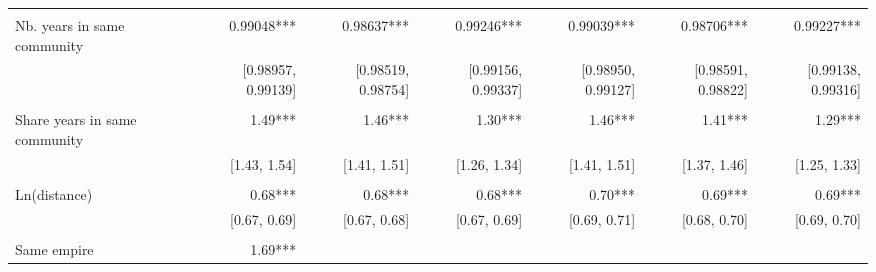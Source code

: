 \begin{table}[!h]
\begin{tabular}{lllllll}
  \multicolumn{1}{r}{} &
  \multicolumn{1}{r}{} &
  \multicolumn{1}{r}{} \\
\multicolumn{1}{l}{Nb. years in same community} &
  \multicolumn{1}{|r}{0.99048***} &
  \multicolumn{1}{r}{0.98637***} &
  \multicolumn{1}{r}{0.99246***} &
  \multicolumn{1}{r}{0.99039***} &
  \multicolumn{1}{r}{0.98706***} &
  \multicolumn{1}{r}{0.99227***} \\
\multicolumn{1}{l}{} &
  \multicolumn{1}{|r}{[0.98957, 0.99139]} &
  \multicolumn{1}{r}{[0.98519, 0.98754]} &
  \multicolumn{1}{r}{[0.99156, 0.99337]} &
  \multicolumn{1}{r}{[0.98950, 0.99127]} &
  \multicolumn{1}{r}{[0.98591, 0.98822]} &
  \multicolumn{1}{r}{[0.99138, 0.99316]} \\
\multicolumn{1}{l}{} &
  \multicolumn{1}{|r}{} &
  \multicolumn{1}{r}{} &
  \multicolumn{1}{r}{} &
  \multicolumn{1}{r}{} &
  \multicolumn{1}{r}{} &
  \multicolumn{1}{r}{} \\
\multicolumn{1}{l}{Share years in same community} &
  \multicolumn{1}{|r}{1.49***} &
  \multicolumn{1}{r}{1.46***} &
  \multicolumn{1}{r}{1.30***} &
  \multicolumn{1}{r}{1.46***} &
  \multicolumn{1}{r}{1.41***} &
  \multicolumn{1}{r}{1.29***} \\
\multicolumn{1}{l}{} &
  \multicolumn{1}{|r}{[1.43,    1.54]} &
  \multicolumn{1}{r}{[1.41,    1.51]} &
  \multicolumn{1}{r}{[1.26,    1.34]} &
  \multicolumn{1}{r}{[1.41,    1.51]} &
  \multicolumn{1}{r}{[1.37,    1.46]} &
  \multicolumn{1}{r}{[1.25,    1.33]} \\
\multicolumn{1}{l}{} &
  \multicolumn{1}{|r}{} &
  \multicolumn{1}{r}{} &
  \multicolumn{1}{r}{} &
  \multicolumn{1}{r}{} &
  \multicolumn{1}{r}{} &
  \multicolumn{1}{r}{} \\
\multicolumn{1}{l}{Ln(distance)} &
  \multicolumn{1}{|r}{0.68***} &
  \multicolumn{1}{r}{0.68***} &
  \multicolumn{1}{r}{0.68***} &
  \multicolumn{1}{r}{0.70***} &
  \multicolumn{1}{r}{0.69***} &
  \multicolumn{1}{r}{0.69***} \\
\multicolumn{1}{l}{} &
  \multicolumn{1}{|r}{[0.67,    0.69]} &
  \multicolumn{1}{r}{[0.67,    0.68]} &
  \multicolumn{1}{r}{[0.67,    0.69]} &
  \multicolumn{1}{r}{[0.69,    0.71]} &
  \multicolumn{1}{r}{[0.68,    0.70]} &
  \multicolumn{1}{r}{[0.69,    0.70]} \\
\multicolumn{1}{l}{} &
  \multicolumn{1}{|r}{} &
  \multicolumn{1}{r}{} &
  \multicolumn{1}{r}{} &
  \multicolumn{1}{r}{} &
  \multicolumn{1}{r}{} &
  \multicolumn{1}{r}{} \\
\multicolumn{1}{l}{Same empire} &
  \multicolumn{1}{|r}{1.69***} &

\end{tabular}
\end{table}
